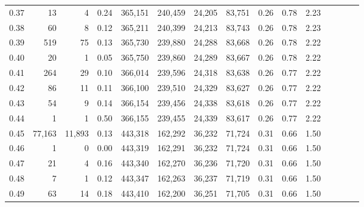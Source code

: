 \begin{tabular}{rrrcrrrrrrrrrrr}
0.37 &      13 &       4 &                                       0.24 &  365,151 &  240,459 &   24,205 &   83,751 &  0.26 &  0.78 &                         2.23 \\
0.38 &      60 &       8 &                                       0.12 &  365,211 &  240,399 &   24,213 &   83,743 &  0.26 &  0.78 &                         2.23 \\
0.39 &     519 &      75 &                                       0.13 &  365,730 &  239,880 &   24,288 &   83,668 &  0.26 &  0.78 &                         2.22 \\
0.40 &      20 &       1 &                                       0.05 &  365,750 &  239,860 &   24,289 &   83,667 &  0.26 &  0.78 &                         2.22 \\
0.41 &     264 &      29 &                                       0.10 &  366,014 &  239,596 &   24,318 &   83,638 &  0.26 &  0.77 &                         2.22 \\
0.42 &      86 &      11 &                                       0.11 &  366,100 &  239,510 &   24,329 &   83,627 &  0.26 &  0.77 &                         2.22 \\
0.43 &      54 &       9 &                                       0.14 &  366,154 &  239,456 &   24,338 &   83,618 &  0.26 &  0.77 &                         2.22 \\
0.44 &       1 &       1 &                                       0.50 &  366,155 &  239,455 &   24,339 &   83,617 &  0.26 &  0.77 &                         2.22 \\
0.45 &  77,163 &  11,893 &                                       0.13 &  443,318 &  162,292 &   36,232 &   71,724 &  0.31 &  0.66 &                         1.50 \\
0.46 &       1 &       0 &                                       0.00 &  443,319 &  162,291 &   36,232 &   71,724 &  0.31 &  0.66 &                         1.50 \\
0.47 &      21 &       4 &                                       0.16 &  443,340 &  162,270 &   36,236 &   71,720 &  0.31 &  0.66 &                         1.50 \\
0.48 &       7 &       1 &                                       0.12 &  443,347 &  162,263 &   36,237 &   71,719 &  0.31 &  0.66 &                         1.50 \\
0.49 &      63 &      14 &                                       0.18 &  443,410 &  162,200 &   36,251 &   71,705 &  0.31 &  0.66 &                         1.50 \\

\end{tabular}
